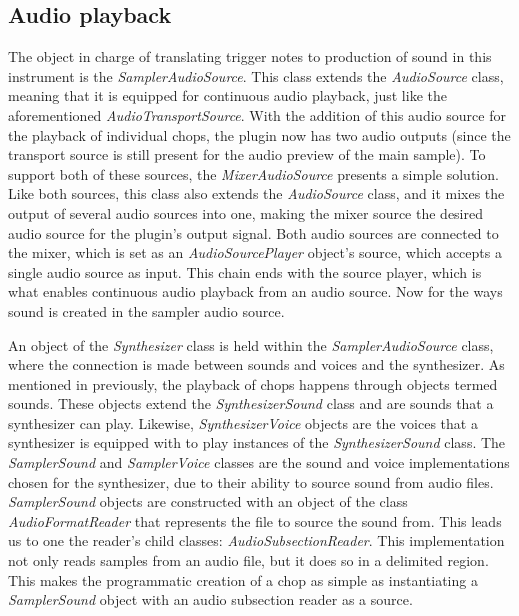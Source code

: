 \documentclass[12pt, a4paper, hidelinks]{article}
\begin{document}
	\subsection{Audio playback}
	The object in charge of translating trigger notes to production of sound in this instrument is the \textit{SamplerAudioSource}. This class extends the \textit{AudioSource} class, meaning that it is equipped for continuous audio playback, just like the aforementioned \textit{AudioTransportSource}. With the addition of this audio source for the playback of individual chops, the plugin now has two audio outputs (since the transport source is still present for the audio preview of the main sample). To support both of these sources, the \textit{MixerAudioSource} presents a simple solution. Like both sources, this class also extends the \textit{AudioSource} class, and it mixes the output of several audio sources into one, making the mixer source the desired audio source for the plugin's output signal. Both audio sources are connected to the mixer, which is set as an \textit{AudioSourcePlayer} object's source, which accepts a single audio source as input. This chain ends with the source player, which is what enables continuous audio playback from an audio source. Now for the ways sound is created in the sampler audio source. \par
	
	An object of the \textit{Synthesizer} class is held within the \textit{SamplerAudioSource} class, where the connection is made between sounds and voices and the synthesizer. As mentioned in previously, the playback of chops happens through objects termed sounds. These objects extend the \textit{SynthesizerSound} class and are sounds that a synthesizer can play. Likewise, \textit{SynthesizerVoice} objects are the voices that a synthesizer is equipped with to play instances of the \textit{SynthesizerSound} class. The \textit{SamplerSound} and \textit{SamplerVoice} classes are the sound and voice implementations chosen for the synthesizer, due to their ability to source sound from audio files. \textit{SamplerSound} objects are constructed with an object of the class \textit{AudioFormatReader} that represents the file to source the sound from. This leads us to one the reader's child classes: \textit{AudioSubsectionReader}. This implementation not only reads samples from an audio file, but it does so in a delimited region. This makes the programmatic  creation of a chop as simple as instantiating a \textit{SamplerSound} object with an audio subsection reader as a source. \par
	
\end{document}
